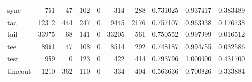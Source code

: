 \begin{tabular}{lrrrrrrrrr}
sync      &                                                751 &                                                 47 &                                                102 &                                                  0 &                                                314 &                                                288 &                                           0.731025 &                               0.937417 &                             0.383489 \\
tac       &                                              12312 &                                                444 &                                                247 &                                                  0 &                                               9445 &                                               2176 &                                           0.757107 &                               0.963938 &                             0.176738 \\
tail      &                                              33975 &                                                 68 &                                                141 &                                                  0 &                                              33205 &                                                561 &                                           0.750552 &                               0.997999 &                             0.016512 \\
tee       &                                               8961 &                                                 47 &                                                108 &                                                  0 &                                               8514 &                                                292 &                                           0.748187 &                               0.994755 &                             0.032586 \\
test      &                                                959 &                                                  0 &                                                123 &                                                  0 &                                                422 &                                                414 &                                           0.793796 &                               1.000000 &                             0.431700 \\
timeout   &                                               1210 &                                                362 &                                                110 &                                                  0 &                                                334 &                                                404 &                                           0.563636 &                               0.700826 &                             0.333884 \\

\end{tabular}
